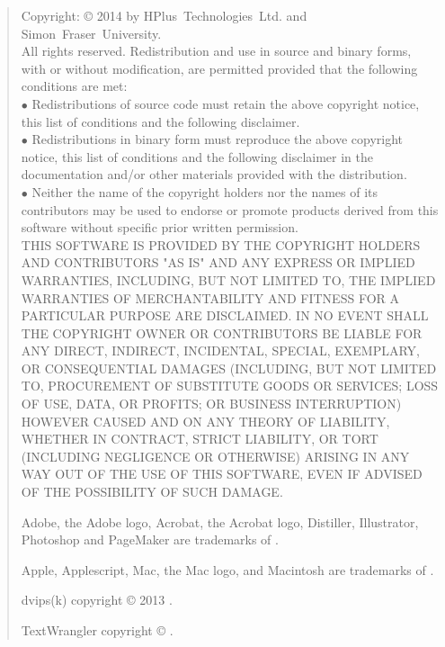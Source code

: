 
\begin{quote}
\begin{small}
Copyright: \copyright{} 2014 by HPlus~Technologies~Ltd. and Simon~Fraser~University.
\\
All rights reserved. Redistribution and use in source and binary forms,
with or without modification, are permitted provided that the following conditions are met:\\
$\bullet$ Redistributions of source code must retain the above copyright notice,
this list of conditions and the following disclaimer.\\
$\bullet$ Redistributions in binary form must reproduce the above copyright notice,
this list of conditions and the following disclaimer in the documentation and/or other materials provided with the distribution.\\
$\bullet$ Neither the name of the copyright holders nor the names of its contributors may be used to endorse
or promote products derived from this software without specific prior written permission.\\
THIS SOFTWARE IS PROVIDED BY THE COPYRIGHT HOLDERS AND CONTRIBUTORS "AS IS" AND ANY EXPRESS OR IMPLIED WARRANTIES,
INCLUDING, BUT NOT LIMITED TO, THE IMPLIED WARRANTIES OF MERCHANTABILITY AND FITNESS FOR A PARTICULAR PURPOSE ARE DISCLAIMED.
IN NO EVENT SHALL THE COPYRIGHT OWNER OR CONTRIBUTORS BE LIABLE FOR ANY DIRECT, INDIRECT, INCIDENTAL, SPECIAL, EXEMPLARY,
OR CONSEQUENTIAL DAMAGES (INCLUDING, BUT NOT LIMITED TO, PROCUREMENT OF SUBSTITUTE GOODS OR SERVICES;
LOSS OF USE, DATA, OR PROFITS; OR BUSINESS INTERRUPTION) HOWEVER CAUSED AND ON ANY THEORY OF LIABILITY, WHETHER IN CONTRACT,
STRICT LIABILITY, OR TORT (INCLUDING NEGLIGENCE OR OTHERWISE) ARISING IN ANY WAY OUT OF THE USE OF THIS SOFTWARE,
EVEN IF ADVISED OF THE POSSIBILITY OF SUCH DAMAGE.

Adobe, the Adobe logo, Acrobat, the Acrobat logo, Distiller, Illustrator, Photoshop and PageMaker are trademarks of
.

Apple, Applescript, Mac, the Mac logo, and Macintosh are trademarks of .

dvips(k) copyright \copyright{} 2013 .

TextWrangler copyright \copyright{} .


\end{small}
\end{quote}
